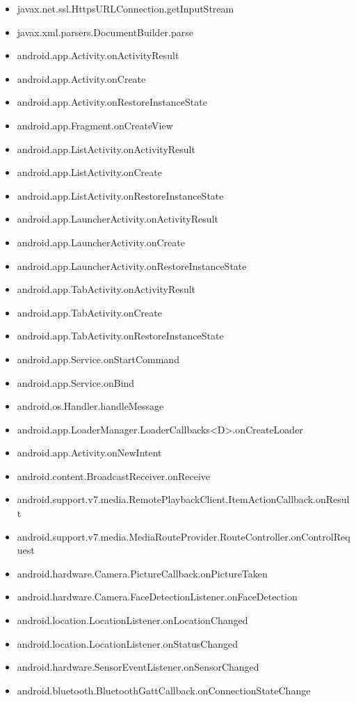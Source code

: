 \documentclass{sig-alternate}
\begin{document}
\begin{itemize}
\item javax.net.ssl.HttpsURLConnection.getInputStream
\item javax.xml.parsers.DocumentBuilder.parse
\item android.app.Activity.onActivityResult
\item android.app.Activity.onCreate
\item android.app.Activity.onRestoreInstanceState
\item android.app.Fragment.onCreateView
\item android.app.ListActivity.onActivityResult
\item android.app.ListActivity.onCreate
\item android.app.ListActivity.onRestoreInstanceState
\item android.app.LauncherActivity.onActivityResult
\item android.app.LauncherActivity.onCreate
\item android.app.LauncherActivity.onRestoreInstanceState
\item android.app.TabActivity.onActivityResult
\item android.app.TabActivity.onCreate
\item android.app.TabActivity.onRestoreInstanceState
\item android.app.Service.onStartCommand
\item android.app.Service.onBind
\item android.os.Handler.handleMessage
\item android.app.LoaderManager.LoaderCallbacks<D>.onCreateLoader
\item android.app.Activity.onNewIntent
\item android.content.BroadcastReceiver.onReceive
\item android.support.v7.media.RemotePlaybackClient.ItemActionCallback.onResult
\item android.support.v7.media.MediaRouteProvider.RouteController.onControlRequest
\item android.hardware.Camera.PictureCallback.onPictureTaken
\item android.hardware.Camera.FaceDetectionListener.onFaceDetection
\item android.location.LocationListener.onLocationChanged
\item android.location.LocationListener.onStatusChanged
\item android.hardware.SensorEventListener.onSensorChanged
\item android.bluetooth.BluetoothGattCallback.onConnectionStateChange

\end{itemize}
\end{document}
